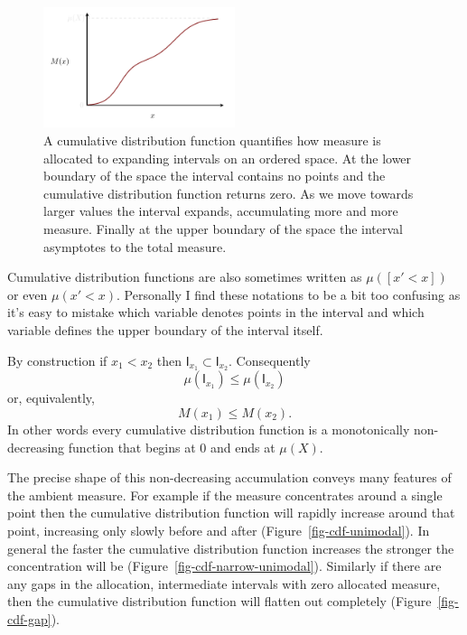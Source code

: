 \documentclass[
  letterpaper,
  DIV=11,
  numbers=noendperiod]{scrartcl}
\begin{document}
\begin{figure}

{\centering \includegraphics[width=0.5\textwidth,height=\textheight]{figures/cdfs/cdf/cdf.pdf}

}

\caption{\label{fig-cdf-basics}A cumulative distribution function
quantifies how measure is allocated to expanding intervals on an ordered
space. At the lower boundary of the space the interval contains no
points and the cumulative distribution function returns zero. As we move
towards larger values the interval expands, accumulating more and more
measure. Finally at the upper boundary of the space the interval
asymptotes to the total measure.}

\end{figure}

Cumulative distribution functions are also sometimes written as
\(\mu([x' < x])\) or even \(\mu(x' < x)\). Personally I find these
notations to be a bit too confusing as it's easy to mistake which
variable denotes points in the interval and which variable defines the
upper boundary of the interval itself.

By construction if \(x_{1} < x_{2}\) then
\(\mathsf{I}_{x_{1}} \subset \mathsf{I}_{x_{2}}\). Consequently \[
\mu(\mathsf{I}_{x_{1}}) \le \mu(\mathsf{I}_{x_{2}})
\] or, equivalently, \[
M(x_{1}) \le M(x_{2}).
\] In other words every cumulative distribution function is a
monotonically non-decreasing function that begins at \(0\) and ends at
\(\mu(X)\).

The precise shape of this non-decreasing accumulation conveys many
features of the ambient measure. For example if the measure concentrates
around a single point then the cumulative distribution function will
rapidly increase around that point, increasing only slowly before and
after (Figure~\ref{fig-cdf-unimodal}). In general the faster the
cumulative distribution function increases the stronger the
concentration will be (Figure~\ref{fig-cdf-narrow-unimodal}). Similarly
if there are any gaps in the allocation, intermediate intervals with
zero allocated measure, then the cumulative distribution function will
flatten out completely (Figure~\ref{fig-cdf-gap}).
\end{document}
